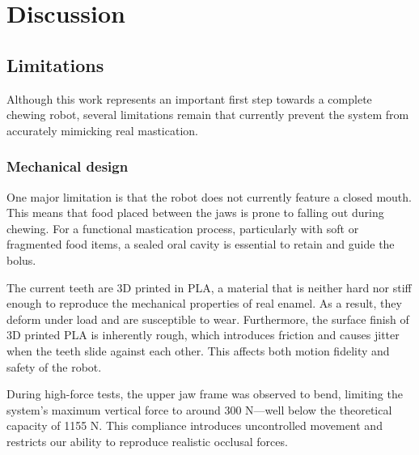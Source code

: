 \section{Discussion}

\subsection{Limitations}

Although this work represents an important first step towards a complete chewing robot, several limitations remain that currently prevent the system from 
accurately mimicking real mastication.

\subsubsection{Mechanical design}
One major limitation is that the robot does not currently feature a closed mouth. This means that food placed between the jaws is prone to falling out during 
chewing. For a functional mastication process, particularly with soft or fragmented food items, a sealed oral cavity is essential to retain and guide the bolus.

The current teeth are 3D printed in PLA, a material that is neither hard nor stiff enough to reproduce the mechanical properties of real enamel. As a result, 
they deform under load and are susceptible to wear. Furthermore, the surface finish of 3D printed PLA is inherently rough, which introduces friction and causes 
jitter when the teeth slide against each other. This affects both motion fidelity and safety of the robot.

During high-force tests, the upper jaw frame was observed to bend, limiting the system's maximum vertical force to around 300 N—well below the theoretical 
capacity of 1155 N. This compliance introduces uncontrolled movement and restricts our ability to reproduce realistic occlusal forces.

